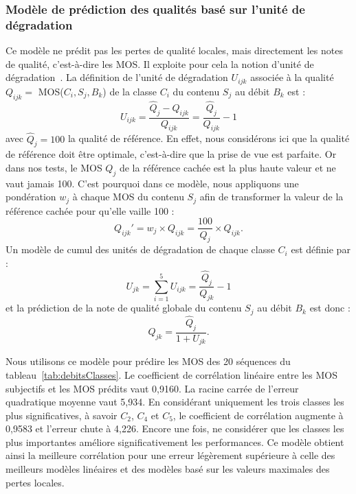 \subsubsection{Modèle de prédiction des qualités basé sur l'unité de dégradation}
Ce modèle ne prédit pas les pertes de qualité locales, mais directement les notes de qualité, c'est-à-dire les MOS. Il exploite pour cela la notion d'unité de dégradation~\cite{ccir}. La définition de l'unité de dégradation $U_{\mathit{ijk}}$ associée à la qualité $Q_{\mathit{ijk}} =$ MOS($C_i, S_j, B_k$) de la classe $C_i$ du contenu $S_j$ au débit $B_k$ est :
\begin{equation}
U_{\mathit{ijk}} = \frac{\hat{Q}_{j} - Q_{\mathit{ijk}}}{Q_{\mathit{ijk}}} = \frac{\hat{Q}_{j}}{Q_{\mathit{ijk}}} - 1
\end{equation}
avec $\hat{Q}_{j} = 100$ la qualité de référence. En effet, nous considérons ici que la qualité de référence doit être optimale, c'est-à-dire que la prise de vue est parfaite. Or dans nos tests, le MOS $Q_{j}$ de la référence cachée est la plus haute valeur et ne vaut jamais 100. C'est pourquoi dans ce modèle, nous appliquons une pondération $w_j$ à chaque MOS du contenu $S_j$ afin de transformer la valeur de la référence cachée pour qu'elle vaille 100 :
\begin{equation}
Q_{\mathit{ijk}}' = w_j \times Q_{\mathit{ijk}} = \frac{100}{Q_{j}}\times Q_{\mathit{ijk}}.
\end{equation}
Un modèle de cumul des unités de dégradation de chaque classe $C_i$ est définie par :
\begin{equation}
U_{jk} = \sum_{i=1}^5 U_{\mathit{ijk}} = \frac{\hat{Q}_{j}}{Q_{\mathit{jk}}} - 1
\end{equation}
et la prédiction de la note de qualité globale du contenu $S_j$ au débit $B_k$ est donc :
\begin{equation}
Q_{\mathit{jk}} = \frac{\hat{Q}_{j}}{1+U_{\mathit{jk}}}.
\end{equation}

Nous utilisons ce modèle pour prédire les MOS des 20 séquences du tableau~\ref{tab:debitsClasses}. Le coefficient de corrélation linéaire entre les MOS subjectifs et les MOS prédits vaut 0,9160. La racine carrée de l'erreur quadratique moyenne vaut 5,934. En considérant uniquement les trois classes les plus significatives, à savoir $C_2$, $C_4$ et $C_5$, le coefficient de corrélation augmente à 0,9583 et l'erreur chute à 4,226. Encore une fois, ne considérer que les classes les plus importantes améliore significativement les performances. Ce modèle obtient ainsi la meilleure corrélation pour une erreur légèrement supérieure à celle des meilleurs modèles linéaires et des modèles basé sur les valeurs maximales des pertes locales.



